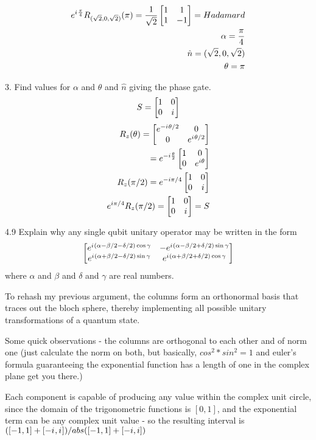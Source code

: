 \documentclass[12pt, letterpaper, twoside]{article}
\newcommand{\iu}{{i\mkern1mu}}
\newcommand{\Hadamard}{\frac{1}{\sqrt{2}}
\begin{bmatrix}
    1 & 1 \\
    1 & -1
\end{bmatrix}}
\newcommand{\Rz}{\begin{bmatrix}
        e^{-\iu\theta/2} & 0 \\
        0 & e^{\iu\theta/2}
    \end{bmatrix}}
\newcommand{\halftheta}{\frac{\theta}{2}}
\newcommand{\twoXtwo}[4]{\begin{bmatrix}
    #1 & #3 \\
    #2 & #4
\end{bmatrix}}
\begin{document}
\begin{subequations}
\begin{align}
		e^{\iu\frac{\pi}{4}} R_{(\sqrt{2}, 0, \sqrt{2})}(\pi) = \Hadamard = Hadamard                                                                                                                                                       \\
		\alpha = \frac{\pi}{4}                                                                                                                                                                                                             \\ \hat{n} = (\sqrt{2}, 0, \sqrt{2}) \\ \theta = \pi
	\end{align}
\end{subequations}

3. Find values for $\alpha$ and $\theta$ and $\hat{n}$ giving the phase gate.
$$
	S = \twoXtwo{1}{0}{0}{\iu}
$$
\begin{subequations}
	\begin{align}
		R_z(\theta) = \Rz                                    \\
		= e^{-i \halftheta} \twoXtwo{1}{0}{0}{e^{i \theta} } \\
		R_z(\pi/2) = e^{-i \pi/4} \twoXtwo{1}{0}{0}{i}       \\
		e^{i \pi/4}R_z(\pi/2) = \twoXtwo{1}{0}{0}{\iu} = S   \\
	\end{align}
\end{subequations}

4.9 Explain why any single qubit unitary operator may be written in the form
$$
	\twoXtwo{e^{\iu (\alpha - \beta/2 - \delta/2)\cos{\gamma}}}{
	e^{\iu (\alpha + \beta/2 - \delta/2)\sin{\gamma}}
	}{
	-e^{\iu (\alpha - \beta/2 + \delta/2)\sin{\gamma}}
	}{
	e^{\iu (\alpha + \beta/2 + \delta/2)\cos{\gamma}}
	}
$$
where $\alpha$ and $\beta$ and $\delta$ and $\gamma$ are real numbers.

To rehash my previous argument, the columns form an orthonormal basis that traces out the bloch sphere, thereby implementing all possible unitary transformations of a quantum state.

Some quick observations - the columns are orthogonal to each other and of norm one (just calculate the norm on both, but basically, $cos^2 * sin^2 = 1$ and euler's formula guaranteeing the exponential function has a length of one in the complex plane get you there.)

Each component is capable of producing any value within the complex unit circle, since the domain of the trigonometric functions is $[0, 1]$, and the exponential term can be any complex unit value - so the resulting interval is $([-1, 1] + [-\iu, \iu ]) / abs([-1, 1] + [-i, i])$
\end{document}
